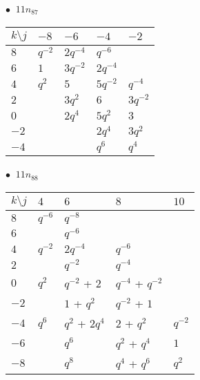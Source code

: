 %
\begin{minipage}{\linewidth}
$\bullet\ $ $11n_{87}$ \vspace{0.5em} \\
\begin{tabular}{l|llll}
$k \setminus j$ & $-8$ & $-6$ & $-4$ & $-2$ \\
\hline
$8$ & $q^{-2}$ & $2q^{-4}$ & $q^{-6}$ &  \\
$6$ & $1$ & $3q^{-2}$ & $2q^{-4}$ &  \\
$4$ & $q^{2}$ & $5$ & $5q^{-2}$ & $q^{-4}$ \\
$2$ &  & $3q^{2}$ & $6$ & $3q^{-2}$ \\
$0$ &  & $2q^{4}$ & $5q^{2}$ & $3$ \\
$-2$ &  &  & $2q^{4}$ & $3q^{2}$ \\
$-4$ &  &  & $q^{6}$ & $q^{4}$ \\
\end{tabular}
\vspace{2em}
\end{minipage}
%
\begin{minipage}{\linewidth}
$\bullet\ $ $11n_{88}$ \vspace{0.5em} \\
\begin{tabular}{l|llll}
$k \setminus j$ & $4$ & $6$ & $8$ & $10$ \\
\hline
$8$ & $q^{-6}$ & $q^{-8}$ &  &  \\
$6$ &  & $q^{-6}$ &  &  \\
$4$ & $q^{-2}$ & $2q^{-4}$ & $q^{-6}$ &  \\
$2$ &  & $q^{-2}$ & $q^{-4}$ &  \\
$0$ & $q^{2}$ & $q^{-2}$ + $2$ & $q^{-4}$ + $q^{-2}$ &  \\
$-2$ &  & $1$ + $q^{2}$ & $q^{-2}$ + $1$ &  \\
$-4$ & $q^{6}$ & $q^{2}$ + $2q^{4}$ & $2$ + $q^{2}$ & $q^{-2}$ \\
$-6$ &  & $q^{6}$ & $q^{2}$ + $q^{4}$ & $1$ \\
$-8$ &  & $q^{8}$ & $q^{4}$ + $q^{6}$ & $q^{2}$ \\
\end{tabular}
\vspace{2em}
\end{minipage}
%
